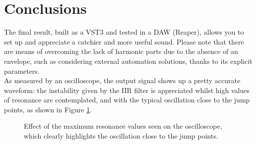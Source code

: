 \documentclass[11pt]{article}
\begin{document}
\section{Conclusions}

The final result, built as a VST3 and tested in a DAW (Reaper), allows you to set up and appreciate a catchier and more useful sound. Please note that there are means of overcoming the lack of harmonic parts due to the absence of an envelope, such as considering external automation solutions, thanks to its explicit parameters.\\
As measured by an oscilloscope, the output signal shows up a pretty accurate waveform: the instability given by the IIR filter is appreciated whilst high values of resonance are contemplated, and with the typical oscillation close to the jump points, as shown in Figure \ref{fig:waves}.

\begin{figure}
\centering
{}
\label{fig:waves}
\caption{Effect of the maximum resonance values seen on the oscilloscope, which clearly highlights the oscillation close to the jump points.}
\end{figure}
\end{document}
